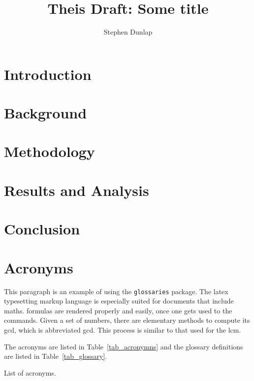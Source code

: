 \documentclass[]{../tex_resources/afitthesis}
\title{ Theis Draft: Some title }
\author{ Stephen Dunlap }
\begin{document}
\maketitle %

\chapter{Introduction}




\chapter{Background}


\chapter{Methodology}



\chapter{Results and Analysis}




\chapter{Conclusion}




\appendix %

\chapter{Acronyms}

This paragraph is an example of using the \verb|glossaries| package. The
\Gls{latex} typesetting markup language is especially suited for documents that
include \gls{maths}. \Glspl{formula} are rendered properly and easily, once one
gets used to the commands. Given a set of numbers, there are elementary methods
to compute its \acrlong{gcd}, which is abbreviated \acrshort{gcd}. This process
is similar to that used for the \acrfull{lcm}.

The acronyms are listed in Table~\ref{tab_acronymns} and the glossary
definitions are listed in Table~\ref{tab_glossary}.

\begin{table}[htbp!]
    \centering
    \caption{List of acronyms.}
    \printglossary[type=\acronymtype]
    \label{tab_acronymns}
\end{table}
\end{document}
